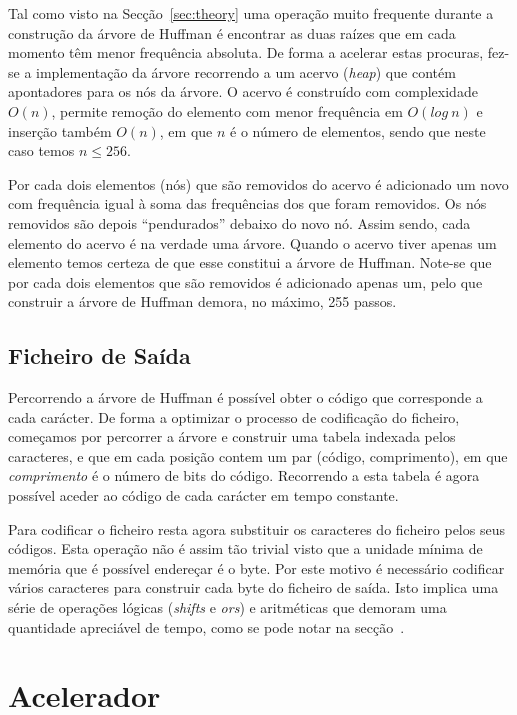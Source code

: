 \documentclass[a4paper]{article}
\begin{document}
	Tal como visto na Secção~\ref{sec:theory} uma operação muito frequente durante a construção da árvore de Huffman é encontrar as duas raízes que em cada momento têm menor frequência absoluta. De forma a acelerar estas procuras, fez-se a implementação da árvore recorrendo a um acervo (\textit{heap}) que contém apontadores para os nós da árvore. O acervo é construído com complexidade $O(n)$, permite remoção do elemento com menor frequência em $O(log\ n)$ e inserção também $O(n)$, em que $n$ é o número de elementos, sendo que neste caso temos $n \leq 256$.

	Por cada dois elementos (nós) que são removidos do acervo é adicionado um novo com frequência igual à soma das frequências dos que foram removidos. Os nós removidos são depois ``pendurados'' debaixo do novo nó. Assim sendo, cada elemento do acervo é na verdade uma árvore. Quando o acervo tiver apenas um elemento temos certeza de que esse constitui a árvore de Huffman. Note-se que por cada dois elementos que são removidos é adicionado apenas um, pelo que construir a árvore de Huffman demora, no máximo, 255 passos.

	\subsection{Ficheiro de Saída}

	Percorrendo a árvore de Huffman é possível obter o código que corresponde a cada carácter. De forma a optimizar o processo de codificação do ficheiro, começamos por percorrer a árvore e construir uma tabela indexada pelos caracteres, e que em cada posição contem um par (código, comprimento), em que \emph{comprimento} é o número de bits do código. Recorrendo a esta tabela é agora possível aceder ao código de cada carácter em tempo constante.

	Para codificar o ficheiro resta agora substituir os caracteres do ficheiro pelos seus códigos. Esta operação não é assim tão trivial visto que a unidade mínima de memória que é possível endereçar é o byte. Por este motivo é necessário codificar vários caracteres para construir cada byte do ficheiro de saída. Isto implica uma série de operações lógicas (\textit{shifts} e \textit{ors}) e aritméticas que demoram uma quantidade apreciável de tempo, como se pode notar na secção~.



	\section{Acelerador}
	\label{sec:accelerator}
\end{document}
